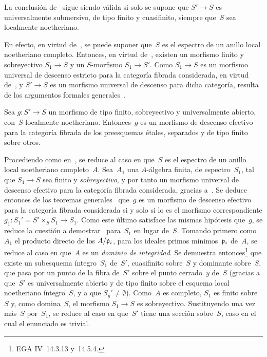 \begin{corollaire}
\label{IX.4.8}
La conclusión de~ sigue siendo válida si solo se supone que
$S'\to S$ es universalmente submersivo, de tipo finito y cuasifinito,
siempre que~$S$ sea localmente noetheriano.
\end{corollaire}

En
efecto, en virtud de~, se puede suponer que~$S$ es el espectro
de un anillo local noetheriano completo. Entonces, en virtud
de~, existen un morfismo finito y sobreyectivo $S_1\to S$ y un
$S$-morfismo $S_1\to S'$. Como $S_1\to S$ es un morfismo universal de
descenso estricto para la categoría fibrada considerada, en virtud
de~, y $S'\to S$ es un morfismo universal de descenso para
dicha categoría,  resulta de los argumentos formales
generales~\cite{IX.D}.

\begin{corollaire}
\label{IX.4.9}
Sea $g\colon S'\to S$ un morfismo de tipo finito, sobreyectivo y
universalmente abierto, con~$S$ localmente noetheriano. Entonces~$g$ es un
morfismo de descenso efectivo para la categoría fibrada de los
preesquemas étales, separados y de tipo finito sobre otros.
\end{corollaire}

Procediendo como en~, se reduce al caso en que~$S$ es el
espectro de un anillo local noetheriano completo~$A$. Sea~$A_1$ una
$A$-álgebra finita, de espectro~$S_1$, tal que $S_1\to S$ sea finito y
\emph{sobreyectivo}, y por tanto un morfismo universal de descenso efectivo
para la categoría fibrada considerada, gracias a~. Se deduce
entonces de los teoremas generales~\cite{IX.D} que~$g$ es un morfismo de
descenso efectivo para la categoría fibrada considerada si y solo si lo es
el morfismo correspondiente
$g_1\colon S_1'=S'\times_S S_1\to S_1$. Como este último satisface las
mismas hipótesis que~$g$, se reduce la cuestión a demostrar~
para~$S_1$ en lugar de~$S$. Tomando primero como~$A_1$ el producto directo
de los $A/\mathfrak{p}_i$, para los ideales primos mínimos~$\mathfrak{p}_i$
de~$A$, se reduce al caso en que~$A$ es un \emph{dominio de integridad}.
Se demuestra entonces\footnote{\Cf EGA IV~14.3.13 y~14.5.4.} que existe un
subesquema íntegro~$S_1$ de~$S'$, cuasifinito sobre~$S$ y dominante
sobre~$S$, que pasa por un punto de la fibra de~$S'$ sobre el punto
cerrado~$y$ de~$S$ (gracias a que~$S'$ es universalmente abierto y de tipo
finito sobre el esquema local noetheriano íntegro~$S$, y a que
$S_y'\neq\emptyset$). Como~$A$ es completo, $S_1$ es finito sobre~$S$ y,
como domina~$S$, el morfismo $S_1\to S$ es sobreyectivo. Sustituyendo una
vez más~$S$ por~$S_1$, se reduce al caso en que~$S'$ tiene una sección
sobre~$S$, caso en el cual el enunciado es trivial.

